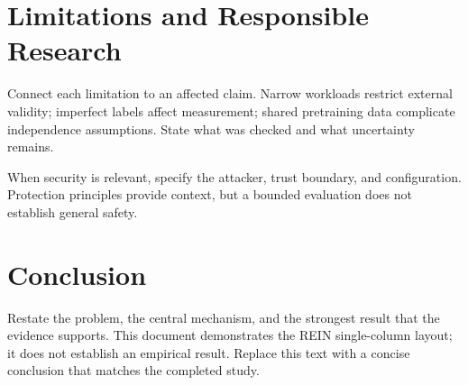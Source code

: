 \section{Limitations and Responsible Research}
Connect each limitation to an affected claim. Narrow workloads restrict
external validity; imperfect labels affect measurement; shared pretraining
data complicate independence assumptions. State what was checked and
what uncertainty remains.

When security is relevant, specify the attacker, trust boundary, and
configuration. Protection principles \citep{saltzer1975} provide context,
but a bounded evaluation does not establish general safety.

\section{Conclusion}
Restate the problem, the central mechanism, and the strongest result that
the evidence supports. This document demonstrates the REIN single-column
layout; it does not establish an empirical result. Replace this text with
a concise conclusion that matches the completed study.

